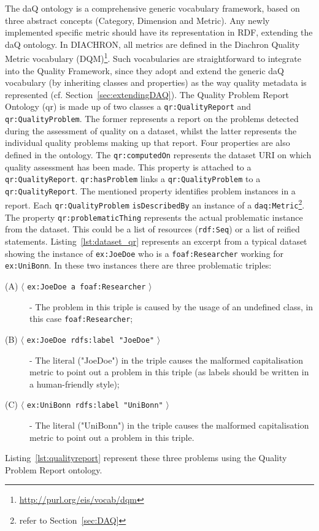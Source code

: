 The daQ ontology is a comprehensive generic vocabulary framework, based on three abstract concepts (Category, Dimension and Metric). 
Any newly implemented specific metric should have its representation in RDF, extending the daQ ontology. In DIACHRON, all metrics are defined in the Diachron Quality Metric vocabulary (DQM)\footnote{\url{http://purl.org/eis/vocab/dqm}}. 
Such vocabularies are straightforward to integrate into the Quality Framework, since they adopt and extend the generic daQ vocabulary (by inheriting classes and properties) as the way quality metadata is represented (cf. Section~\ref{sec:extendingDAQ}).
The Quality Problem Report Ontology (qr) is made up of two classes a \texttt{qr:QualityReport} and \texttt{qr:QualityProblem}. 
The former represents a report on the problems detected during the assessment of quality on a dataset, whilst the latter represents the individual quality problems making up that report. 
Four properties are also defined in the ontology. 
The \texttt{qr:computedOn} represents the dataset URI on which quality assessment has been made. 
This property is attached to a \texttt{qr:QualityReport}. \texttt{qr:hasProblem} links a \texttt{qr:QualityProblem} to a \texttt{qr:QualityReport}. 
The mentioned property identifies problem instances in a report. 
Each \texttt{qr:QualityProblem} \texttt{isDescribedBy} an instance of a \texttt{daq:Metric}\footnote{refer to Section~\ref{sec:DAQ}}. 
The property \texttt{qr:problematicThing} represents the actual problematic instance from the dataset. This could be a list of resources (\texttt{rdf:Seq}) or a list of reified statements.
Listing~\ref{lst:dataset_qr} represents an excerpt from a typical dataset showing the instance of \texttt{ex:JoeDoe} who is a \texttt{foaf:Researcher} working for \texttt{ex:UniBonn}.
In these two instances there are three problematic triples:
\begin{description}
\item [(A) $\langle$ \texttt{ex:JoeDoe a foaf:Researcher} $\rangle$] - The problem in this triple is caused by the usage of an undefined class, in this case \texttt{foaf:Researcher};
\item [(B) $\langle$ \texttt{ex:JoeDoe rdfs:label "JoeDoe"} $\rangle$] - The literal ("JoeDoe") in the triple causes the malformed capitalisation metric to point out a problem in this triple (as labels should be written in a human-friendly style);
\item [(C) $\langle$ \texttt{ex:UniBonn rdfs:label "UniBonn"} $\rangle$] - The literal ("UniBonn") in the triple causes the malformed capitalisation metric to point out a problem in this triple.
\end{description}
Listing~\ref{lst:qualityreport} represent these three problems using the Quality Problem Report ontology.



